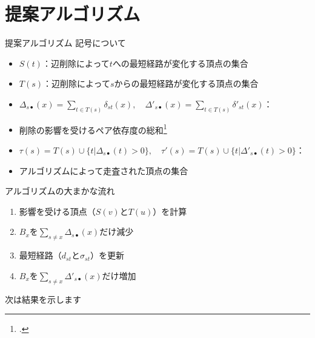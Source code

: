 \documentclass[dvipdfmx,fleqn]{beamer}
\begin{document}
\section{提案アルゴリズム}
\begin{frame}[allowframebreaks]{提案アルゴリズム}
  記号について
  \begin{itemize}\small
    \item $S(t)$：辺削除によって$t$への最短経路が変化する頂点の集合
    \item $T(s)$：辺削除によって$s$からの最短経路が変化する頂点の集合
    \item $\Delta_{s\bullet}(x)=\sum_{t\in T(s)}\delta_{st}(x),\quad\Delta'_{s\bullet}(x)=\sum_{t\in T(s)}\delta'_{st}(x)$：
    \item[] 削除の影響を受けるペア依存度の総和\footcite{31Bergamini2017}
    \item $\tau(s)=T(s)\cup\{t|\Delta_{s\bullet}(t)>0\},\quad\tau'(s)=T(s)\cup\{t|\Delta'_{s\bullet}(t)>0\}$：
    \item[] アルゴリズムによって走査された頂点の集合
  \end{itemize}
  \medskip
  アルゴリズムの大まかな流れ
  \begin{enumerate}
  \item 影響を受ける頂点（$S(v)$と$T(u)$）を計算
  \item $B_x$を$\sum_{s\neq x}\Delta_{s\bullet}(x)$だけ減少
  \item 最短経路（$d_{st}$と$\sigma_{st}$）を更新
  \item $B_x$を$\sum_{s\neq x}\Delta'_{s\bullet}(x)$だけ増加
  \end{enumerate}
  \begin{flushright}
    \alert{次は結果を示します}
  \end{flushright}

\end{frame}
\end{document}
